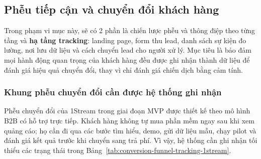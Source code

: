 %
%
%
%
%
%

\subsection{Phễu tiếp cận và chuyển đổi khách hàng}

Trong phạm vi mục này, sẽ có 2 phần là chiến lược phễu và thông điệp theo từng tầng và \textbf{hạ tầng
tracking}: landing page, form thu lead, danh sách sự kiện đo lường, nơi lưu dữ
liệu và cách chuyển lead cho người xử lý. Mục tiêu là bảo đảm mọi hành động quan
trọng của khách hàng đều được ghi nhận thành dữ liệu để đánh giá hiệu quả chuyển đổi,
thay vì chỉ đánh giá chiến dịch bằng cảm tính.

\subsubsection{Khung phễu chuyển đổi cần được hệ thống ghi nhận}

Phễu chuyển đổi của 1Stream trong giai đoạn MVP được thiết kế theo mô hình B2B
có hỗ trợ trực tiếp. Khách hàng không tự mua phần mềm ngay sau khi xem quảng cáo;
họ cần đi qua các bước tìm hiểu, demo, gửi dữ liệu mẫu, chạy pilot và đánh giá
kết quả trước khi chuyển sang trả phí. Vì vậy, hệ thống cần ghi nhận tối thiểu
các trạng thái trong Bảng~\ref{tab:conversion-funnel-tracking-1stream}.

